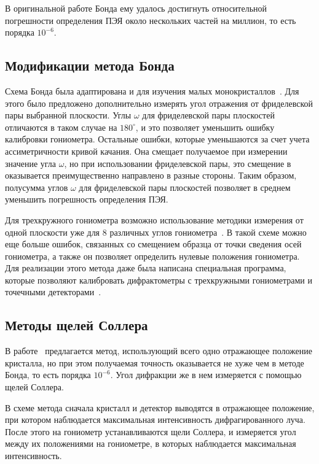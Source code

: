 \documentclass[a4paper,14pt]{extarticle}
\newcommand{\degree}{^\circ}
\begin{document}
В оригинальной работе Бонда ему удалось достигнуть относительной погрешности определения ПЭЯ около нескольких частей на миллион, то есть порядка $10^{-6}$.

\subsection{Модификации метода Бонда}

Схема Бонда была адаптирована и для изучения малых монокристаллов~\cite{Hubbard:1976,Ponomarev:1969}.
Для этого было предложено дополнительно измерять угол отражения от фриделевской пары выбранной плоскости.
Углы $\omega$ для фриделевской пары плоскостей отличаются в таком случае на $180\degree$, и это позволяет уменьшить ошибку калибровки гониометра.
Остальные ошибки, которые уменьшаются за счет учета ассиметричности кривой качания.
Она смещает получаемое при измерении значение угла $\omega$, но при использовании фриделевской пары, это смещение в оказывается преимущественно направлено в разные стороны.
Таким образом, полусумма углов $\omega$ для фриделевской пары плоскостей позволяет в среднем уменьшить погрешность определения ПЭЯ.

Для трехкружного гониометра возможно использование методики измерения от одной плоскости уже для 8 различных углов гониометра~\cite{King:1979}.
В такой схеме можно еще больше ошибок, связанных со смещением образца от точки сведения осей гониометра, а также он позволяет определить нулевые положения гониометра.
Для реализации этого метода даже была написана специальная программа, которые позволяют калибровать дифрактометры с трехкружными гониометрами и точечными детекторами~\cite{Angel:2011}.

\subsection{Методы щелей Соллера}

В работе~\cite{Berger:1984} предлагается метод, использующий всего одно отражающее положение кристалла, но при этом получаемая точность оказывается не хуже чем в методе Бонда, то есть порядка $10^{-6}$.
Угол дифракции же в нем измеряется с помощью щелей Соллера.

В схеме метода сначала кристалл и детектор выводятся в отражающее положение, при котором наблюдается максимальная интенсивность дифрагированного луча.
После этого на гониометр устанавливаются щели Соллера, и измеряется угол между их положениями на гониометре, в которых наблюдается максимальная интенсивность.
\end{document}
